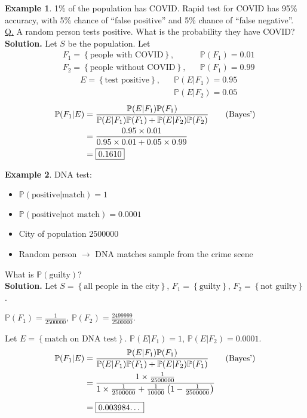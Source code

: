 \documentclass[a4paper,11pt]{amsbook}
\theoremstyle{definition}
\newtheorem{example}{\hspace{-2em} \color{darkblue} Example}[chapter]
\theoremstyle{remark}
\renewcommand{\P}{\mathbb{P}}
\newcommand\0{\varnothing}
\begin{document}
    \begin{example}
        1\% of the population has COVID. Rapid test for COVID has 95\% accuracy, with
        5\% chance of ``false positive'' and 5\% chance of ``false negative''.\\
        \underline{Q.} A random person tests positive. What is the probability they have COVID?\\
        \textbf{Solution.} Let $S$ be the population. Let \begin{align*}
            &F_1=\left\{\text{people with COVID}\right\},&&\P(F_1)=0.01 \\
            &F_2=\left\{\text{people without COVID}\right\},&&\P(F_1)=0.99
        \end{align*}
        \begin{align*}
            &E=\left\{\text{test positive}\right\},&&\P(E|F_1)=0.95 \\
            &&&\P(E|F_2)=0.05
        \end{align*}
        \begin{align*}
            \P(F_1|E)&=\frac{\P(E|F_1)\P(F_1)}{\P(E|F_1)\P(F_1)+\P(E|F_2)\P(F_2)} \tag{Bayes'} \\
            &=\frac{0.95\times0.01}{0.95\times0.01+0.05\times0.99} \\
            &=\fbox{0.1610}
        \end{align*}
    \end{example}

    \begin{example}
        DNA test: \begin{itemize}
            \item $\P(\text{positive}|\text{match})=1$
            \item $\P(\text{positive}|\text{not match})=0.0001$
        \end{itemize}
        \begin{itemize}
            \item City of population 2500000
            \item Random person $\to$ DNA matches sample from the crime scene
        \end{itemize}
        
        What is $\P(\text{guilty})$?\\
        \textbf{Solution.} Let $S=\left\{\text{all people in the city}\right\}$, $F_1=\left\{\text{guilty}\right\}$, $F_2=\left\{\text{not guilty}\right\}$.
        
        $\P(F_1)=\frac1{2500000}$, $\P(F_2)=\frac{2499999}{2500000}$.
        
        Let $E=\left\{\text{match on DNA test}\right\}$. $\P(E|F_1)=1$, $\P(E|F_2)=0.0001$.
        \begin{align*}
            \P(F_1|E)&=\frac{\P(E|F_1)\P(F_1)}{\P(E|F_1)\P(F_1)+\P(E|F_2)\P(F_1)} \tag{Bayes'} \\
            &=\frac{1\times\frac{1}{2500000}}{1\times\frac{1}{2500000}+\frac{1}{10000}\left(1-\frac{1}{2500000}\right)} \\[5pt]
            &=\fbox{0.003984\ldots}
        \end{align*}
    \end{example}
\end{document}
